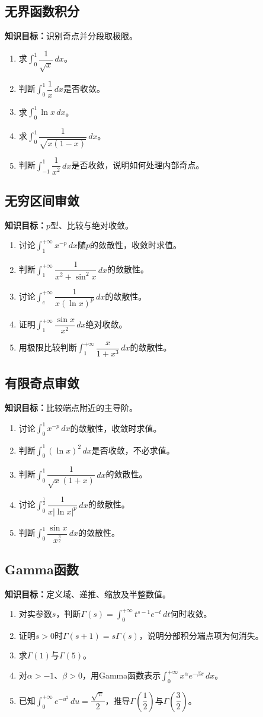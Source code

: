 \documentclass[11pt,a4paper,fontset=fandol]{ctexrep}
\newcommand{\goal}[1]{\textbf{知识目标：}#1\par}
\begin{document}
\subsection{无界函数积分}
\goal{识别奇点并分段取极限。}
\begin{enumerate}
\item 求$\int_0^1\dfrac{1}{\sqrt x}\,dx$。
\item 判断$\int_0^1\dfrac{1}{x}\,dx$是否收敛。
\item 求$\int_0^1\ln x\,dx$。
\item 求$\int_0^1\dfrac{1}{\sqrt{x(1-x)}}\,dx$。
\item 判断$\int_{-1}^1\dfrac{1}{x^2}\,dx$是否收敛，说明如何处理内部奇点。
\end{enumerate}
\subsection{无穷区间审敛}
\goal{$p$型、比较与绝对收敛。}
\begin{enumerate}
\item 讨论$\int_1^{+\infty}x^{-p}\,dx$随$p$的敛散性，收敛时求值。
\item 判断$\int_1^{+\infty}\dfrac{1}{x^2+\sin^2x}\,dx$的敛散性。
\item 讨论$\int_e^{+\infty}\dfrac{1}{x(\ln x)^p}\,dx$的敛散性。
\item 证明$\int_1^{+\infty}\dfrac{\sin x}{x^2}\,dx$绝对收敛。
\item 用极限比较判断$\int_1^{+\infty}\dfrac{x}{1+x^3}\,dx$的敛散性。
\end{enumerate}
\subsection{有限奇点审敛}
\goal{比较端点附近的主导阶。}
\begin{enumerate}
\item 讨论$\int_0^1x^{-p}\,dx$的敛散性，收敛时求值。
\item 判断$\int_0^1(\ln x)^2\,dx$是否收敛，不必求值。
\item 判断$\int_0^1\dfrac{1}{\sqrt x(1+x)}\,dx$的敛散性。
\item 讨论$\int_0^{\frac12}\dfrac{1}{x|\ln x|^p}\,dx$的敛散性。
\item 判断$\int_0^1\dfrac{\sin x}{x^{\frac32}}\,dx$的敛散性。
\end{enumerate}
\subsection{Gamma函数}
\goal{定义域、递推、缩放及半整数值。}
\begin{enumerate}
\item 对实参数$s$，判断$\Gamma(s)=\int_0^{+\infty}t^{s-1}e^{-t}\,dt$何时收敛。
\item 证明$s>0$时$\Gamma(s+1)=s\Gamma(s)$，说明分部积分端点项为何消失。
\item 求$\Gamma(1)$与$\Gamma(5)$。
\item 对$\alpha>-1$、$\beta>0$，用Gamma函数表示$\int_0^{+\infty}x^\alpha e^{-\beta x}\,dx$。
\item 已知$\int_0^{+\infty}e^{-u^2}\,du=\dfrac{\sqrt\pi}{2}$，推导$\Gamma\left(\dfrac12\right)$与$\Gamma\left(\dfrac32\right)$。
\end{enumerate}
\end{document}
